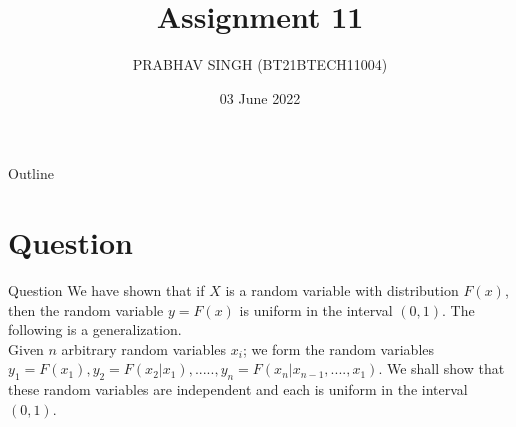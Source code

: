 \documentclass{beamer}
\title{Assignment 11}
\author{PRABHAV SINGH (BT21BTECH11004)}
\date{03 June 2022}
\begin{document}
	
	\begin{frame}
		\titlepage 
	\end{frame}
	
	\logo{}
	
	
	\begin{frame}{Outline}
		\tableofcontents
	\end{frame}
	
	\section{Question}
	\begin{frame}{Question}
	We have shown that if $  X  $ is a random variable with distribution $ F(x) $, 
	then the random variable $ y = F(x) $ is uniform in the interval $  (0, 1) $. The following is a 
	generalization. \\
	Given $ n $ arbitrary random variables $  x_{i} $; we form the random variables 
	$ y_{1}=F(x_{1}) ,y_{2}=F(x_{2}|x_{1}), ..... , y_{n}=F(x_{n}|x_{n-1},....,x_1{})  $.
	We shall show that these random variables are independent and each is uniform in the 
	interval $ (0, 1) $. 
	\end{frame}
	
	
\end{document}
